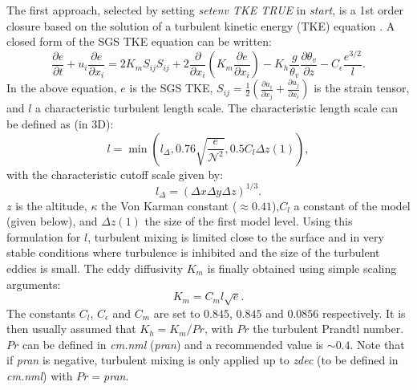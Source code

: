 \documentclass[12pt,A4,french]{article}
\begin{document}
The first approach, selected by setting {\it setenv TKE TRUE} in {\it start}, is a 1st order closure based on the solution of a turbulent kinetic energy (TKE) equation \cite{Stull88, MW1989}. A closed form of the SGS TKE equation can be written:
\begin{equation}
\frac{\partial e}{\partial t} + u_{i}\frac{\partial e}{\partial x_{i}} = 2K_{m}S_{ij}S_{ij} + 2\frac{\partial}{\partial x_{i}}\left(K_{m}
\frac{\partial e}{\partial x_{i}}\right) - K_{h} \frac{g}{\theta_v}\frac{\partial \theta_v}{\partial z} - C_{\epsilon} \frac{e^{3/2}}{l}.
\label{tke}
\end{equation}
In the above equation, $e$ is the SGS TKE, $S_{ij} = \frac{1}{2}\left(\frac{\partial u_{i}}{\partial x_{j}} + \frac{\partial u_{j}}{\partial x_{i}}\right)$ is the 
strain tensor, and $l$ a characteristic turbulent length scale. The characteristic length scale can be defined as (in 3D):
\begin{equation}
l = \min\left(l_{\Delta},0.76\sqrt{\frac{e}{\mathcal{N}^{2}}},0.5 C_l \Delta z\left(1\right)\right),
\end{equation}
with the characteristic cutoff scale given by:
\begin{equation}
l_{\Delta} = \left(\Delta x \Delta y \Delta z\right)^{1/3}.
\end{equation}
$z$ is the altitude, $\kappa$ the Von Karman constant ($\approx 0.41$),$C_l$ a constant of the model (given below), and $\Delta z\left(1\right)$ the size of the first model level. Using this formulation for $l$, turbulent mixing is limited close to the surface and in very stable conditions where turbulence is inhibited and the size of the turbulent eddies is small. The eddy diffusivity $K_{m}$ is finally obtained using simple scaling arguments:
\begin{equation}
K_{m} = C_{m} l \sqrt{e}.
\end{equation}
The constants $C_{l}$, $C_{\epsilon}$ and $C_{m}$ are set to $0.845$, $0.845$ and $0.0856$ respectively. It is then usually assumed that $K_{h} = 
K_{m}/Pr$, with $Pr$ the turbulent Prandtl number. $Pr$ can be defined in {\it cm.nml} ({\it pran}) and a recommended value is $\sim 0.4$. Note that if {\it pran} is negative, turbulent mixing is only applied up to {\it zdec} (to be defined in {\it cm.nml}) with $Pr =${\it pran}.
\end{document}
